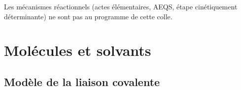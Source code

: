 \documentclass[11pt,a4paper]{article}
\begin{document}
\begin{horsprog}
Les mécanismes réactionnels (actes élémentaires, AEQS, étape cinétiquement déterminante) ne sont
pas au programme de cette colle.
\end{horsprog}

\section{Molécules et solvants}

\subsection{Modèle de la liaison covalente}
\end{document}
